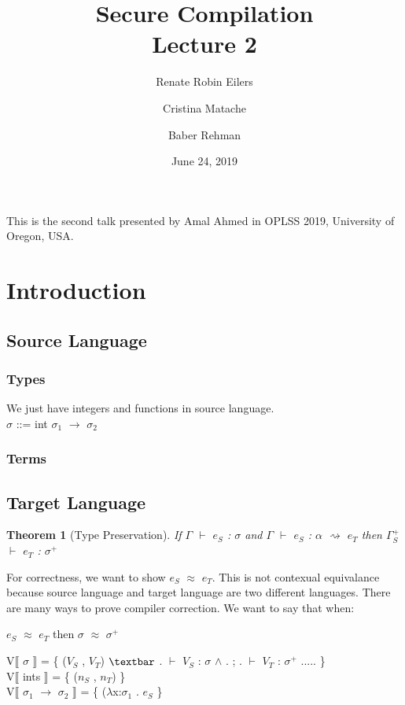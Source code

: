 \documentclass{article}
\title{Secure Compilation \\ \Large{Lecture 2}}
\author{Renate Robin Eilers  \and Cristina Matache \and Baber Rehman}
\date{June 24, 2019}
\newtheorem{theorem}{Theorem}[section]
\begin{document}
\maketitle

This is the second talk presented by Amal Ahmed in OPLSS 2019, University of Oregon, USA.

\section{Introduction}

\subsection{Source Language}

\subsubsection{Types}

We just have integers and functions in source language. \\

$\sigma$ ::= int \textbar \hspace{0.1cm} $\sigma_1$ $\rightarrow$ $\sigma_2$

\subsubsection{Terms}

\subsection{Target Language}


\begin{theorem}[Type Preservation]
If $\Gamma$ $\vdash$ $e_S$ : $\sigma$ and  $\Gamma$ $\vdash$ $e_S$ : $\alpha$ $\rightsquigarrow$ $e_T$ then $\Gamma_S^+$ $\vdash$ $e_T$ : $\sigma^+$
\end{theorem}

For correctness, we want to show $e_S$ $\approx$ $e_T$. This is not contexual equivalance because source language and target language are two different languages.
There are many ways to prove compiler correction. We want to say that when:
\begin{center}
 $e_S$ $\approx$ $e_T$ then $\sigma$ $\approx$ $\sigma^+$
\end{center}
V$\llbracket$ $\sigma$ $\rrbracket$  = \{  ($V_S$ , $V_T$) $\textbar$ . $\vdash$ $V_{S}$ : $\sigma$ $\wedge$ . ; . $\vdash$ $V_{T}$ : $\sigma^+$ ..... \} \\
V$\llbracket$ ints $\rrbracket$ = \{ ($n_S$ , $n_T$) \} \\
V$\llbracket$ $\sigma_1$ $\rightarrow$ $\sigma_2$ $\rrbracket$ = \{ ($\lambda$x:$\sigma_1$ . $e_S$ \}
\end{document}
